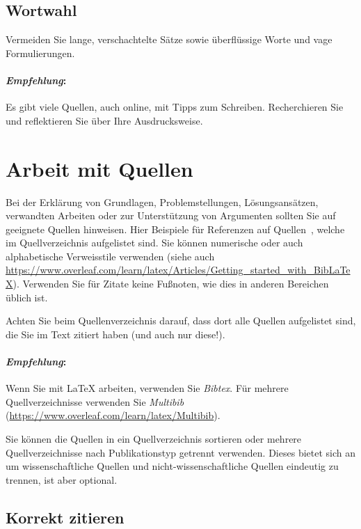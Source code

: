 \subsection{Wortwahl}

Vermeiden Sie lange, verschachtelte Sätze sowie überflüssige Worte und vage Formulierungen.

\paragraph{\textit{Empfehlung}:}
Es gibt viele Quellen, auch online, mit Tipps zum Schreiben. Recherchieren Sie und reflektieren Sie über Ihre Ausdrucksweise.


\section{Arbeit mit Quellen}
\label{sec:arbeit-mit-quellen}

Bei der Erklärung von Grundlagen, Problemstellungen, Lösungsansätzen, verwandten Arbeiten oder zur Unterstützung von Argumenten sollten Sie auf geeignete Quellen hinweisen. Hier Beispiele für Referenzen auf Quellen~\cite{Greenyer2007,Greenyer2013}, welche im Quellverzeichnis aufgelistet sind. 
Sie können numerische oder auch alphabetische Verweisstile verwenden (siehe auch \url{https://www.overleaf.com/learn/latex/Articles/Getting_started_with_BibLaTeX}). Verwenden Sie für Zitate keine Fußnoten, wie dies in anderen Bereichen üblich ist.

Achten Sie beim Quellenverzeichnis darauf, dass dort alle Quellen aufgelistet sind, die Sie im Text zitiert haben (und auch nur diese!).

\paragraph{\textit{Empfehlung}:}
Wenn Sie mit \LaTeX{} arbeiten, verwenden Sie \textit{Bibtex}. Für mehrere Quellverzeichnisse verwenden Sie \textit{Multibib} (\url{https://www.overleaf.com/learn/latex/Multibib}).

Sie können die Quellen in ein Quellverzeichnis sortieren oder mehrere Quellverzeichnisse nach Publikationstyp getrennt verwenden. Dieses bietet sich an um wissenschaftliche Quellen und nicht-wissenschaftliche Quellen eindeutig zu trennen, ist aber optional.

\subsection{Korrekt zitieren}

